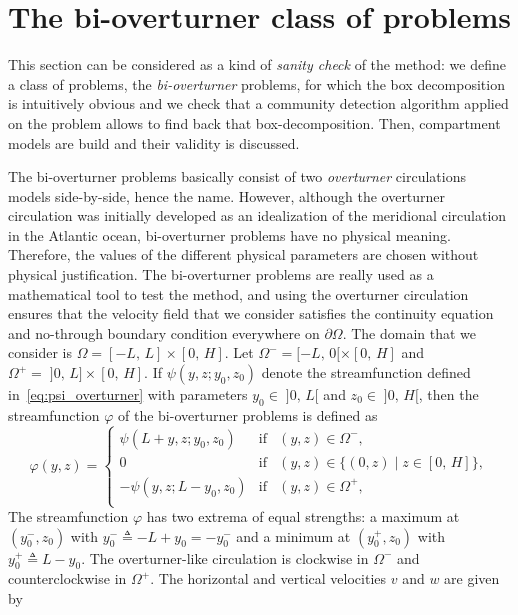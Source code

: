 \section{The bi-overturner class of problems}
This section can be considered as a kind of \textit{sanity check} of the method: we define a class of problems, the \textit{bi-overturner} problems, for which the box decomposition is intuitively obvious and we check that a community detection algorithm applied on the problem allows to find back that box-decomposition. Then, compartment models are build and their validity is discussed. 

The bi-overturner problems basically consist of two \textit{overturner} circulations models side-by-side, hence the name. However, although the overturner circulation was initially developed as an idealization of the meridional circulation in the Atlantic ocean, bi-overturner problems have no physical meaning. Therefore, the values of the different physical parameters are chosen without physical justification. The bi-overturner problems are really used as a mathematical tool to test the method, and using the overturner circulation ensures that the velocity field that we consider satisfies the continuity equation and no-through boundary condition everywhere on $\partial \Omega$. The domain that we consider is $\Omega = [-L,\,L]\times[0,\,H]$. Let $\Omega^- = [-L,\,0[\times[0,\,H]$ and $\Omega^+ =\; ]0,\,L]\times[0,\,H]$. If $\psi(y,z;y_0,z_0)$ denote the streamfunction defined in~\eqref{eq:psi_overturner} with parameters $y_0 \in\; ]0,\,L[$ and $z_0 \in\; ]0,\,H[$, then the streamfunction $\varphi$ of the bi-overturner problems is defined as
\begin{equation} \label{eq:psi_2box}
	\varphi(y,z) = \left\{ 
		\begin{array}{lrr}
			\psi(L+y,z;y_0,z_0) & \mbox{if} & (y,z) \in \Omega^-,\\
			0 & \mbox{if} & (y,z) \in \{(0,z)\;|\;z \in [0,\,H]\},\\
			-\psi(y,z;L-y_0,z_0) & \mbox{if} & (y,z) \in \Omega^+,\\
		\end{array}
	\right.
\end{equation}
The streamfunction $\varphi$ has two extrema of equal strengths: a maximum at $(y_0^-,z_0)$ with $y_0^- \triangleq -L+y_0 = -y_0^-$ and a minimum at $(y_0^+,z_0)$ with $y_0^+ \triangleq L-y_0$. The overturner-like circulation is clockwise in $\Omega^-$ and counterclockwise in $\Omega^+$. The horizontal and vertical velocities $v$ and $w$ are given by
